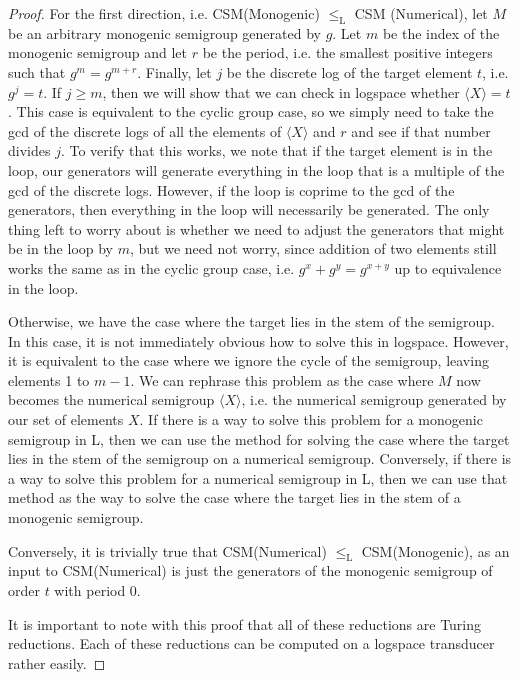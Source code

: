 \documentclass[a4paper,12pt]{article}
\theoremstyle{plain}
\theoremstyle{definition}
\theoremstyle{remark}
\begin{document}
\begin{proof}
  For the first direction, i.e. CSM(Monogenic) $\leq_\text{L}$ CSM (Numerical), let $M$ be an arbitrary monogenic semigroup generated by $g$. Let $m$ be the index of the monogenic semigroup and let $r$ be the period, i.e. the smallest positive integers such that $g^m=g^{m+r}$. Finally, let $j$ be the discrete log of the target element $t$, i.e. $g^j=t$. If $j\geq m$, then we will show that we can check in logspace whether $\langle X\rangle=t$. This case is equivalent to the cyclic group case, so we simply need to take the gcd of the discrete logs of all the elements of $\langle X\rangle$ and $r$ and see if that number divides $j$. To verify that this works, we note that if the target element is in the loop, our generators will generate everything in the loop that is a multiple of the gcd of the discrete logs. However, if the loop is coprime to the gcd of the generators, then everything in the loop will necessarily be generated. The only thing left to worry about is whether we need to adjust the generators that might be in the loop by $m$, but we need not worry, since addition of two elements still works the same as in the cyclic group case, i.e. $g^x+g^y=g^{x+y}$ up to equivalence in the loop. \vspace{\baselineskip}
    
  Otherwise, we have the case where the target lies in the stem of the semigroup. In this case, it is not immediately obvious how to solve this in logspace. However, it is equivalent to the case where we ignore the cycle of the semigroup, leaving elements 1 to $m-1$. We can rephrase this problem as the case where $M$ now becomes the numerical semigroup $\langle X\rangle$, i.e. the numerical semigroup generated by our set of elements $X$. If there is a way to solve this problem for a monogenic semigroup in L, then we can use the method for solving the case where the target lies in the stem of the semigroup on a numerical semigroup. Conversely, if there is a way to solve this problem for a numerical semigroup in L, then we can use that method as the way to solve the case where the target lies in the stem of a monogenic semigroup. \vspace{\baselineskip}

  Conversely, it is trivially true that CSM(Numerical) $\leq_\text{L}$ CSM(Monogenic), as an input to CSM(Numerical) is just the generators of the monogenic semigroup of order $t$ with period 0. \vspace{\baselineskip}
    
  It is important to note with this proof that all of these reductions are Turing reductions. Each of these reductions can be computed on a logspace transducer rather easily.
\end{proof}
\end{document}
